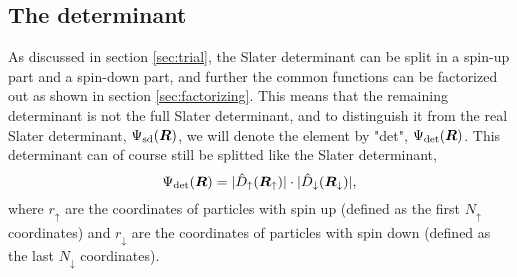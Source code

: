 \subsection{The determinant} \label{sec:slaterdeterminant}
As discussed in section \ref{sec:trial}, the Slater determinant can be split in a spin-up part and a spin-down part, and further the common functions can be factorized out as shown in section \ref{sec:factorizing}. This means that the remaining determinant is not the full Slater determinant, and to distinguish it from the real Slater determinant, $\Psi_{\text{sd}}(\boldsymbol{{R}})$, we will denote the element by "det", $\Psi_{\text{det}}(\boldsymbol{{R}})$. This determinant can of course still be splitted like the Slater determinant, 
\begin{equation}
\Psi_{\text{det}}(\boldsymbol{{R}})=
|\hat{D}_{\uparrow}(\boldsymbol{{R}}_{\uparrow})|\cdot |\hat{D}_{\downarrow}(\boldsymbol{{R}}_{\downarrow})|,
\end{equation}
where $r_{\uparrow}$ are the coordinates of particles with spin up (defined as the first $N_{\uparrow}$ coordinates) and $r_{\downarrow}$ are the coordinates of particles with spin down (defined as the last $N_{\downarrow}$ coordinates). 

